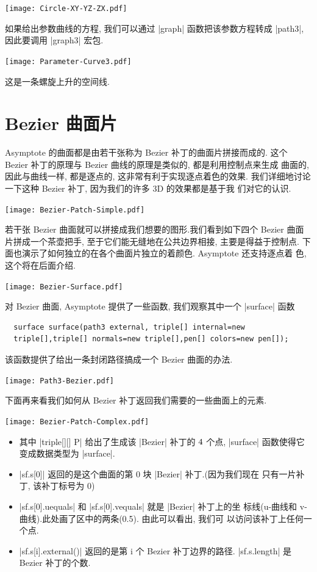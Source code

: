 \documentclass[nofonts,CJKnormalspaces]{ctexbook}
\begin{document}
\begin{center}\texttt{[image: Circle-XY-YZ-ZX.pdf]}\end{center}%


如果给出参数曲线的方程, 我们可以通过 |graph| 函数把该参数方程转成
|path3|, 因此要调用 |graph3| 宏包.
\begin{center}\texttt{[image: Parameter-Curve3.pdf]}\end{center}%

这是一条螺旋上升的空间线.

\section{Bezier 曲面片}
Asymptote 的曲面都是由若干张称为 Bezier 补丁的曲面片拼接而成的. 这个
Bezier 补丁的原理与 Bezier 曲线的原理是类似的, 都是利用控制点来生成
曲面的, 因此与曲线一样, 都是逐点的, 这非常有利于实现逐点着色的效果.
我们详细地讨论一下这种 Bezier 补丁, 因为我们的许多 3D 的效果都是基于我
们对它的认识.
\begin{center}\texttt{[image: Bezier-Patch-Simple.pdf]}\end{center}%

若干张 Bezier 曲面就可以拼接成我们想要的图形.我们看到如下四个 Bezier 曲面
片拼成一个茶壶把手, 至于它们能无缝地在公共边界相接, 主要是得益于控制点.
下面也演示了如何独立的在各个曲面片独立的着颜色. Asymptote 还支持逐点着
色, 这个将在后面介绍.
\begin{center}\texttt{[image: Bezier-Surface.pdf]}\end{center}%

对 Bezier 曲面, Asymptote 提供了一些函数, 我们观察其中一个 |surface| 函数
\begin{lstlisting}
  surface surface(path3 external, triple[] internal=new
  triple[],triple[] normals=new triple[],pen[] colors=new pen[]);
\end{lstlisting}
该函数提供了给出一条封闭路径搞成一个 Bezier 曲面的办法.
\begin{center}\texttt{[image: Path3-Bezier.pdf]}\end{center}%

下面再来看我们如何从 Bezier 补丁返回我们需要的一些曲面上的元素.
\begin{center}\texttt{[image: Bezier-Patch-Complex.pdf]}\end{center}%

\begin{itemize}
\item 其中 |triple[][] P| 给出了生成该 |Bezier| 补丁的 $4 \time 4$ 个点,
  |surface| 函数使得它变成数据类型为 |surface|.
\item |sf.s[0]| 返回的是这个曲面的第 0 块 |Bezier| 补丁.(因为我们现在
  只有一片补丁, 该补丁标号为 0)
\item |sf.s[0].uequals| 和 |sf.s[0].vequals| 就是 |Bezier| 补丁上的坐
  标线(u-曲线和 v-曲线).此处画了区中的两条(0.5). 由此可以看出, 我们可
  以访问该补丁上任何一个点.
\item |sf.s[i].external()| 返回的是第 i 个 Bezier 补丁边界的路径.
  |sf.s.length| 是 Bezier 补丁的个数.
\end{itemize}
\end{document}
